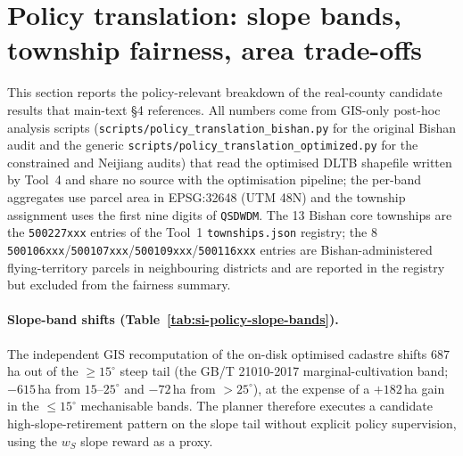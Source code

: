 \documentclass[11pt]{article}
\begin{document}
\section{Policy translation: slope bands, township fairness, area trade-offs}\label{si:policy-translation}

This section reports the policy-relevant breakdown of the real-county candidate results that main-text \S4 references. All numbers come from GIS-only post-hoc analysis scripts (\texttt{scripts/policy\_translation\_bishan.py} for the original Bishan audit and the generic \texttt{scripts/policy\_translation\_optimized.py} for the constrained and Neijiang audits) that read the optimised DLTB shapefile written by Tool~4 and share no source with the optimisation pipeline; the per-band aggregates use parcel area in EPSG:32648 (UTM 48N) and the township assignment uses the first nine digits of \texttt{QSDWDM}. The 13 Bishan core townships are the \texttt{500227xxx} entries of the Tool~1 \texttt{townships.json} registry; the 8 \texttt{500106xxx}/\texttt{500107xxx}/\texttt{500109xxx}/\texttt{500116xxx} entries are Bishan-administered flying-territory parcels in neighbouring districts and are reported in the registry but excluded from the fairness summary.

\paragraph{Slope-band shifts (Table~\ref{tab:si-policy-slope-bands}).} The independent GIS recomputation of the on-disk optimised cadastre shifts $687$\,ha out of the $\geq 15^{\circ}$ steep tail (the GB/T 21010-2017 marginal-cultivation band; $-615$\,ha from $15$--$25^{\circ}$ and $-72$\,ha from $>25^{\circ}$), at the expense of a $+182$\,ha gain in the $\leq 15^{\circ}$ mechanisable bands. The planner therefore executes a candidate high-slope-retirement pattern on the slope tail without explicit policy supervision, using the $w_S$ slope reward as a proxy.
\end{document}
